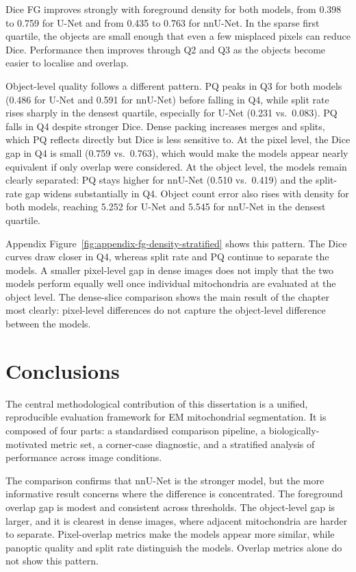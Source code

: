 \documentclass[logo,bsc,singlespacing,parskip,online]{infthesis}
\begin{document}
Dice FG improves strongly with foreground density for both models, from 0.398
to 0.759 for U-Net and from 0.435 to 0.763 for nnU-Net. In the sparse first
quartile, the objects are small enough that even a few misplaced pixels can
reduce Dice. Performance then improves through Q2 and Q3 as the objects become
easier to localise and overlap.

Object-level quality follows a different pattern. PQ peaks in Q3 for both
models (0.486 for U-Net and 0.591 for nnU-Net) before falling in Q4, while
split rate rises sharply in the densest quartile, especially for U-Net (0.231
vs.\ 0.083). PQ falls in Q4 despite stronger Dice. Dense packing increases
merges and splits, which PQ reflects directly but Dice is less sensitive to.
At the pixel level, the Dice gap in Q4 is
small (0.759 vs.\ 0.763), which would make the models appear nearly equivalent 
if only overlap were considered. At the object level, the models remain clearly separated:
PQ stays higher for nnU-Net (0.510 vs.\ 0.419) and the split-rate gap widens
substantially in Q4. Object count error also rises with density for both
models, reaching 5.252 for U-Net and 5.545 for nnU-Net in the densest quartile.

Appendix Figure~\ref{fig:appendix-fg-density-stratified} shows this pattern. The Dice
curves draw closer in Q4, whereas split rate and PQ continue to separate the
models. A smaller pixel-level gap in dense images does not imply that the two
models perform equally well once individual mitochondria are evaluated at the
object level. The dense-slice comparison shows the main result of the chapter most clearly:
pixel-level differences do not capture the object-level difference between the models. 



\chapter{Conclusions}
The central methodological contribution of this dissertation is a unified,
reproducible evaluation framework for EM mitochondrial segmentation. It is 
composed of four parts: a
standardised comparison pipeline, a biologically-motivated metric set, a
corner-case diagnostic, and a stratified analysis of performance
across image conditions. 

The comparison confirms that nnU-Net is the stronger model, but the more
informative result concerns where the difference is concentrated. The foreground
overlap gap is modest and consistent across thresholds. The object-level gap is
larger, and it is clearest in dense images, where adjacent mitochondria are
harder to separate. Pixel-overlap metrics make the models appear more similar, while
panoptic quality and split rate distinguish the models. Overlap metrics
alone do not show this pattern.
\end{document}
